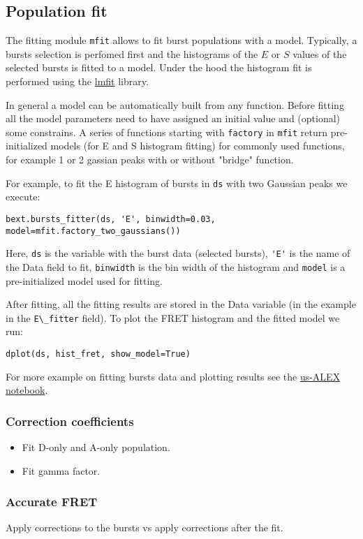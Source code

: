
\subsection{Population fit}

The fitting module \verb|mfit| allows to fit burst populations with a model. Typically, a bursts selection is perfomed first and the histograms of the $E$ or $S$ values of the selected bursts is fitted to a model. Under the hood the
histogram fit is performed using the \href{http://lmfit.github.io/lmfit-py/}{lmfit} library.

In general a model can be automatically built from any function. Before fitting all the model parameters need to have assigned an initial value and (optional) some constrains. A series of functions starting with \verb|factory| in \verb|mfit| return pre-initialized models (for E and S histogram fitting) for commonly used functions, for example 1 or 2 gassian peaks with or without "bridge" function.

For example, to fit the E histogram of bursts in \verb|ds| with two Gaussian peaks we execute:

\begin{verbatim}
bext.bursts_fitter(ds, 'E', binwidth=0.03, model=mfit.factory_two_gaussians())
\end{verbatim}

Here, \verb|ds| is the variable with the burst data (selected bursts), \verb|'E'| is the name of the Data field to fit, \verb|binwidth| is the bin width of the histogram and \verb|model| is a pre-initialized model used for fitting.

After fitting, all the fitting results are stored in the Data variable (in the example in the \verb|E\_fitter| field).
To plot the FRET histogram and the fitted model we run:

\begin{verbatim}
dplot(ds, hist_fret, show_model=True)
\end{verbatim}

For more example on fitting bursts data and plotting results see the \href{http://nbviewer.ipython.org/urls/raw.github.com/tritemio/FRETBursts_notebooks/master/notebooks/FRETBursts\%2520-\%2520us-ALEX\%2520smFRET\%2520burst\%2520analysis.ipynb}{us-ALEX notebook}.


\subsubsection{Correction coefficients}


\begin{itemize}
\item Fit D-only and A-only population.
\item Fit gamma factor.
\end{itemize}


\subsubsection{Accurate FRET}

Apply corrections to the bursts vs apply corrections after the fit.

